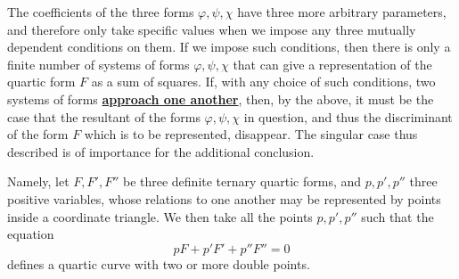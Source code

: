 \documentclass{article}
\newcommand{\unsure}[1]{\underline{\textbf{#1}}}
\newcommand{\oldpage}[1]{\marginpar{\footnotesize$\Big\vert$ \textit{p.~#1}}}
\begin{document}
The coefficients of the three forms $\varphi,\psi,\chi$ have three more arbitrary parameters, and therefore only take specific values when we impose any three mutually dependent conditions on them.
If we impose such conditions, then there is only a finite number of systems of forms $\varphi,\psi,\chi$ that can give a representation of the quartic form $F$ as a sum of squares.
If, with any choice of such conditions, two systems of forms \unsure{approach one another}, then, by the above, it must be the case that the resultant of the forms $\varphi,\psi,\chi$ in question, and thus the discriminant of the form $F$ which is to be represented, disappear.
The singular case thus described is of importance for the additional conclusion.

Namely, let $F,F',F''$ be three definite ternary quartic forms, and $p,p',p''$ three positive variables, whose relations to one another may be represented by points inside a coordinate triangle.
\oldpage{344}
We then take all the points $p,p',p''$ such that the equation
\[
\label{equation3}
  pF + p'F' + p''F'' = 0
\tag{3}
\]
defines a quartic curve with two or more double points.
\end{document}
